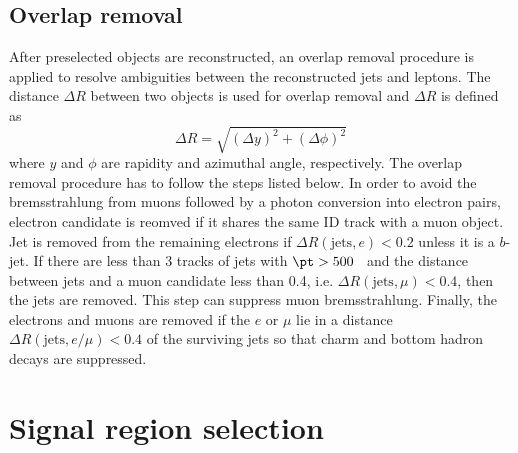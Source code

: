 
\subsection{Overlap removal}
\label{subsec:event_overlap_removal}
After preselected objects are reconstructed, an overlap removal procedure is applied to resolve ambiguities between the reconstructed jets and leptons.
The distance $\Delta R$ between two objects is used for overlap removal and $\Delta R$ is defined as
%
\begin{equation}
    \Delta R = \sqrt{(\Delta y)^{2} + (\Delta \phi)^{2}}
\end{equation}
%
where $y$ and $\phi$ are rapidity and azimuthal angle, respectively.
The overlap removal procedure has to follow the steps listed below.
In order to avoid the bremsstrahlung from muons followed by a photon conversion into electron pairs, electron candidate is reomved if it shares the same ID track with a muon object.
Jet is removed from the remaining electrons if $\Delta R(\mathrm{jets}, e) < 0.2$ unless it is a $b$-jet.
If there are less than 3 tracks of jets with $\pt > 500$~{\MeV} and the distance between jets and a muon candidate less than 0.4, i.e. $\Delta R(\mathrm{jets}, \mu) < 0.4$, then the jets are removed.
This step can suppress muon bremsstrahlung.
Finally, the electrons and muons are removed if the $e$ or $\mu$ lie in a distance $\Delta R(\mathrm{jets}, e/\mu) < 0.4$ of the surviving jets so that charm and bottom hadron decays are suppressed.


\section{Signal region selection}
\label{sec:event_signal_region_selection}



